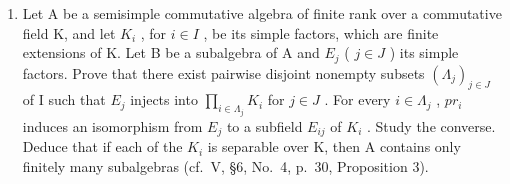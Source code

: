 \begin{enumerate}
\def\labelenumi{\arabic{enumi})}
\setcounter{enumi}{5}
\tightlist
\item
  Let A be a semisimple commutative algebra of finite rank over a commutative field K, and let \(K_{i}\) , for \(i \in I\) , be its simple factors, which are finite extensions of K. Let B be a subalgebra of A and \(E_{j}\) ( \(j \in J\) ) its simple factors. Prove that there exist pairwise disjoint nonempty subsets \((\Lambda_{j})_{j \in J}\) of I such that \(E_{j}\) injects into \(\prod_{i \in \Lambda_{j}} K_{i}\) for \(j \in J\) . For every \(i \in \Lambda_{j}\) , \(pr_{i}\) induces an isomorphism from \(E_{j}\) to a subfield \(E_{ij}\) of \(K_{i}\) . Study the converse. Deduce that if each of the \(K_{i}\) is separable over K, then A contains only finitely many subalgebras (cf.~V, §6, No.~4, p.~30, Proposition 3).
\end{enumerate}

